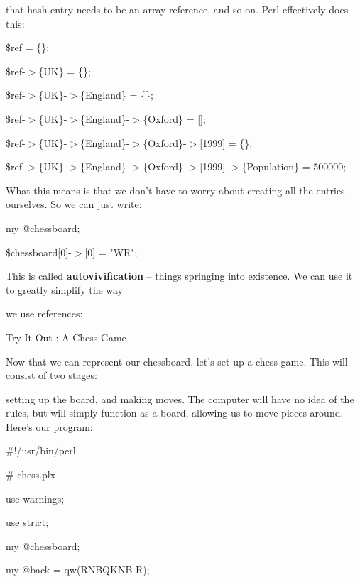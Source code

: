 \documentclass[a4paper,11pt]{book}
\begin{document}
\noindent that hash entry needs to be an array reference, and so on. Perl effectively does this:

\noindent 

\noindent 

\noindent \$ref = \{\};

\noindent \$ref-$>$\{UK\} = \{\};

\noindent \$ref-$>$\{UK\}-$>$\{England\} = \{\};

\noindent \$ref-$>$\{UK\}-$>$\{England\}-$>$\{Oxford\} = [];

\noindent \$ref-$>$\{UK\}-$>$\{England\}-$>$\{Oxford\}-$>$[1999] = \{\};

\noindent \$ref-$>$\{UK\}-$>$\{England\}-$>$\{Oxford\}-$>$[1999]-$>$\{Population\} = 500000;

\noindent 

\noindent What this means is that we don't have to worry about creating all the entries ourselves. So we can just write:

\noindent 

\noindent my @chessboard;

\noindent \$chessboard[0]-$>$[0] = "WR";

\noindent 

\noindent 

\noindent This is called \textbf{autovivification }-- things springing into existence. We can use it to greatly simplify the way

\noindent we use references:

\noindent 

\noindent Try It Out : A Chess Game

\noindent 

\noindent Now that we can represent our chessboard, let's set up a chess game. This will consist of two stages:

\noindent setting up the board, and making moves. The computer will have no idea of the rules, but will simply function as a board, allowing us to move pieces around. Here's our program:

\noindent 

\noindent \#!/usr/bin/perl

\noindent \# chess.plx

\noindent use warnings;

\noindent use strict;

\noindent 

\noindent my @chessboard;

\noindent my @back = qw(RNBQKNB R);
\end{document}
